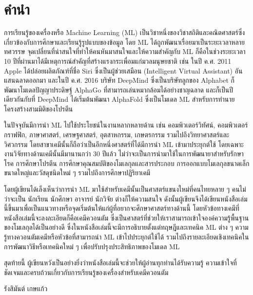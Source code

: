 

\chapter*{คำนำ}

การเรียนรู้ของเครื่องหรือ Machine Learning (ML) เป็นวิชาหนึ่งของวิชาสถิติและคณิตศาสตร์ซึ่งเกี่ยวข้องกับการศึกษาและเรียนรู้รูปแบบของข้อมูล 
โดย ML ได้ถูกพัฒนาเรื่อยมาเป็นระยะเวลาหลายทศวรรษ จุดเปลี่ยนที่น่าสนใจที่ทำให้คนหันมาสนใจและให้ความสำคัญกับ ML
ก็คือในช่วงระยะเวลา 10 ปีที่ผ่านมาได้มีเหตุการณ์สำคัญที่สร้างแรงกระเพื่อมแก่มวลมนุษยชาติ เช่น ในปี ค.ศ. 2011 Apple ได้ปล่อยผลิตภัณฑ์ที่ชื่อ 
Siri ซึ่งเป็นผู้ช่วยเสมือน (Intelligent Virtual Assistant) อันแสนฉลาดออกมา และในปี ค.ศ. 2016 บริษัท DeepMind ซึ่งเป็นบริษัทลูกของ
Alphabet ก็พัฒนาโมเดลปัญญาประดิษฐ์ AlphaGo ที่สามารถเล่นหมากล้อมได้อย่างชาญฉลาด และก็เป็นปีเดียวกันกับที่ DeepMind ได้เริ่มต้นพัฒนา AlphaFold
ซึ่งเป็นโมเดล ML สำหรับการทำนายโครงสร้างสามมิติของโปรตีน

ในปัจจุบันมีการนำ ML ไปใช้ประโยชน์ในงานหลากหลายด้าน เช่น คอมพิวเตอร์วิทัศน์, คอมพิวเตอร์กราฟฟิก, ภาษาศาสตร์, เศรษฐศาสตร์, 
อุตสาหกรรม, เกษตรกรรม รวมไปถึงวิทยาศาสตร์และวิศวกรรม โดยสาขาเคมีนั้นก็ถือว่าเป็นอีกหนึ่งศาสตร์ที่ได้มีการนำ ML เข้ามาประยุกต์ใช้
โดยเฉพาะงานวิจัยทางด้านเคมีนั้นมีมานานกว่า 30 ปีแล้ว ไม่ว่าจะเป็นการนำมาใช้ในการพัฒนายาสำหรับรักษาโรค การศึกษาโปรตีน 
การศึกษาคุณสมบัติของโมเลกุลและสารประกอบ การออกแบบโมเลกุลขนาดเล็ก ขนาดใหญ่และวัสดุชนิดใหม่ ๆ รวมไปถึงการศึกษาปฏิริยาเคมี

โดยผู้เขียนได้เล็งเห็นว่าการนำ ML มาใช้สำหรับเคมีนั้นเป็นศาสตร์แขนงใหม่ที่คนไทยหลาย ๆ คนไม่ว่าจะเป็น นักเรียน นักศึกษา อาจารย์ นักวิจัย
ต่างก็ให้ความสนใจ ดังนั้นผู้เขียนจึงได้เขียนหนังสือเล่มนี้ขึ้นมาเพื่อเป็นแนวทางหรือจุดเริ่มต้นให้แก่ผู้ที่อยากจะศึกษาศาสตร์ทางด้านนี้ 
โดยหัวข้อทางเคมีที่หนังสือเล่มนี้จะลงละเอียดก็คือเคมีควอนตัม ซึ่งเป็นศาสตร์ที่ช่วยให้เราสามารถเข้าใจองค์ความรู้พื้นฐานของโมเลกุลได้เป็นอย่างดี 
ซึ่งในหนังสือเล่มนี้จะมีการอธิบายตั้งแต่ทฤษฎีและเทคนิค ML ต่าง ๆ ความรู้ทางควอนตัมเคมีหรือหัวข้อที่สามารถนำ ML เข้าไปประยุกต์ใช้ได้ 
รวมไปถึงรายละเอียดเชิงเทคนิคในการพัฒนาวิธีหรือเทคนิคใหม่ ๆ เพื่อปรับปรุงประสิทธิภาพของโมเดล ML 

สุดท้ายนี้ ผู้เขียนหวังเป็นอย่างยิ่งว่าหนังสือเล่มนี้จะช่วยให้ผู้อ่านทุกท่านได้รับความรู้ ความเข้าใจที่ชัดเจนและครบถ้วนเกี่ยวกับการเรียนรู้ของเครื่องสำหรับเคมีควอนตัม

\medskip

\begin{flushright}
รังสิมันต์ เกษแก้ว
\end{flushright}